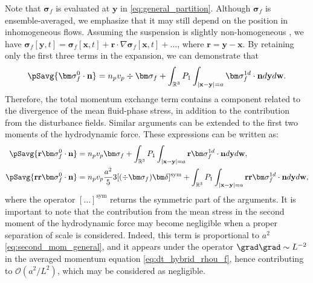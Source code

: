 Note that $\bm\sigma_f$ is evaluated at $\textbf{y}$ in \ref{eq:general_partition}. 
Although $\bm\sigma_f$ is ensemble-averaged, we emphasize that it may still depend on the position in inhomogeneous flows. 
Assuming the suspension is slightly non-homogeneous \citep{lhuillier1992ensemble}, we have $\bm\sigma_f[\textbf{y},t] = \bm\sigma_f[\textbf{x},t] + \textbf{r}\cdot \nabla\bm\sigma_f[\textbf{x},t] + \ldots$, where $\textbf{r} = \textbf{y} - \textbf{x}$. 
By retaining only the first three terms in the expansion, we can demonstrate that
\begin{equation}
    \pSavg{\bm\sigma_f^0\cdot\textbf{n}}
    =
    n_p v_p 
    \div\bm\sigma_f
    +
    \int_{\mathbb{R}^3}
    P_1
    \int_{|\textbf{x}-\textbf{y}|=a}
    \bm\sigma_f^{1d} \cdot \textbf{n}
    d\textbf{y}d\textbf{w}.
    \label{eq:drag_final}
\end{equation}
Therefore, the total momentum exchange term contains a component related to the divergence of the mean fluid-phase stress, in addition to the contribution from the disturbance fields. 
Similar arguments can be extended to the first two moments of the hydrodynamic force. 
These expressions can be written as:
\begin{align}
    \pSavg{\textbf{r}\bm\sigma_f^0\cdot\textbf{n}}
    &=
    n_p v_p \bm\sigma_f
    +
    \int_{\mathbb{R}^3}
    P_1
    \int_{|\textbf{x}-\textbf{y}|=a}
    \textbf{r}\bm\sigma_f^{1d} \cdot \textbf{n}
    d\textbf{y}
    d\textbf{w},
    \label{eq:first_mom_general}
    \\
    \pSavg{\textbf{rr}\bm\sigma_f^0\cdot\textbf{n}}
    &=
    n_pv_p  \frac{a^2}{5} 3 [(\div \bm\sigma_f)\bm\delta]^\text{sym}
    +
    \int_{\mathbb{R}^3}
    P_1
    \int_{|\textbf{x}-\textbf{y}|=a}
    \textbf{rr}\bm\sigma_f^{1d} \cdot \textbf{n}
    d\textbf{y}
    d\textbf{w},
    \label{eq:second_mom_general}
\end{align}
where the operator $[\ldots]^\text{sym}$ returns the symmetric part of the arguments. 
It is important to note that the contribution from the mean stress in the second moment of the hydrodynamic force may become negligible when a proper separation of scale is considered. 
Indeed, this term is proportional to $a^2$ \eqref{eq:second_mom_general}, and it appears under the operator $\grad\grad\sim L^{-2}$ in the averaged momentum equation \ref{eq:dt_hybrid_rhou_f}, hence contributing to $\mathcal{O}(a^2/L^2)$, which may be considered as negligible. 

